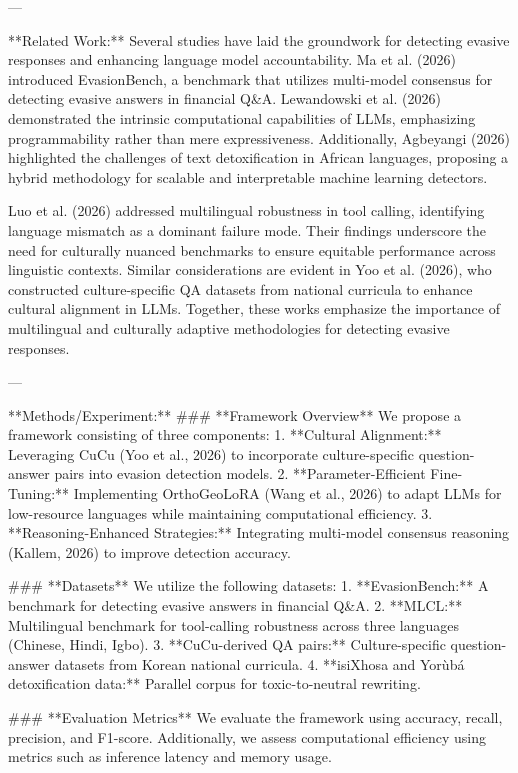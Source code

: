 ---

**Related Work:**  
Several studies have laid the groundwork for detecting evasive responses and enhancing language model accountability. Ma et al. (2026) introduced EvasionBench, a benchmark that utilizes multi-model consensus for detecting evasive answers in financial Q&A. Lewandowski et al. (2026) demonstrated the intrinsic computational capabilities of LLMs, emphasizing programmability rather than mere expressiveness. Additionally, Agbeyangi (2026) highlighted the challenges of text detoxification in African languages, proposing a hybrid methodology for scalable and interpretable machine learning detectors.

Luo et al. (2026) addressed multilingual robustness in tool calling, identifying language mismatch as a dominant failure mode. Their findings underscore the need for culturally nuanced benchmarks to ensure equitable performance across linguistic contexts. Similar considerations are evident in Yoo et al. (2026), who constructed culture-specific QA datasets from national curricula to enhance cultural alignment in LLMs. Together, these works emphasize the importance of multilingual and culturally adaptive methodologies for detecting evasive responses.

---

**Methods/Experiment:**  
### **Framework Overview**  
We propose a framework consisting of three components:  
1. **Cultural Alignment:** Leveraging CuCu (Yoo et al., 2026) to incorporate culture-specific question-answer pairs into evasion detection models.  
2. **Parameter-Efficient Fine-Tuning:** Implementing OrthoGeoLoRA (Wang et al., 2026) to adapt LLMs for low-resource languages while maintaining computational efficiency.  
3. **Reasoning-Enhanced Strategies:** Integrating multi-model consensus reasoning (Kallem, 2026) to improve detection accuracy.

### **Datasets**  
We utilize the following datasets:  
1. **EvasionBench:** A benchmark for detecting evasive answers in financial Q&A.  
2. **MLCL:** Multilingual benchmark for tool-calling robustness across three languages (Chinese, Hindi, Igbo).  
3. **CuCu-derived QA pairs:** Culture-specific question-answer datasets from Korean national curricula.  
4. **isiXhosa and Yorùbá detoxification data:** Parallel corpus for toxic-to-neutral rewriting.

### **Evaluation Metrics**  
We evaluate the framework using accuracy, recall, precision, and F1-score. Additionally, we assess computational efficiency using metrics such as inference latency and memory usage.

